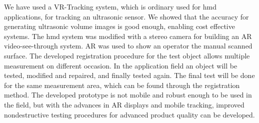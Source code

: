 \documentclass{VRARWorkshop}
\begin{document}
We have used a VR-Tracking system, which is ordinary used for {\sc hmd} applications, for tracking an ultrasonic sensor. We showed that the accuracy for generating ultrasonic volume images is good enough, enabling cost effective systems. The {\sc hmd} system was modified with a stereo camera for building an AR video-see-through system. AR was used to show an operator the manual scanned surface. The developed registration procedure for the test object allows multiple measurement on different occasion. In the application field an object will be tested, modified and repaired, and finally tested again. The final test will be done for the same measurement area, which can be found through the registration method. The developed prototype is not mobile and robust enough to be used in the field, but with the advances in AR displays and mobile tracking, improved nondestructive testing procedures for advanced product quality can be developed.

\VRARsetbibstyle

\end{document}
